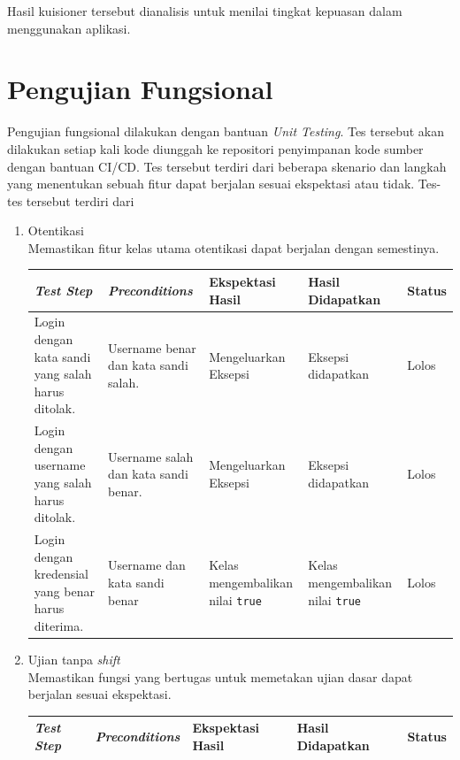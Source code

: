     Hasil kuisioner tersebut dianalisis untuk menilai tingkat kepuasan dalam menggunakan aplikasi.

\section{Pengujian Fungsional}
Pengujian fungsional dilakukan dengan bantuan \textit{Unit Testing}. Tes tersebut akan dilakukan
setiap kali kode diunggah ke repositori penyimpanan kode sumber dengan bantuan CI/CD. Tes tersebut
terdiri dari beberapa skenario dan langkah yang menentukan sebuah fitur dapat berjalan sesuai ekspektasi
atau tidak. Tes-tes tersebut terdiri dari
\begin{enumerate}
    \item Otentikasi\\
        Memastikan fitur kelas utama otentikasi dapat berjalan dengan semestinya.\\
        \begin{longtable}{|p{}|p{}|p{}|p{}|p{}|}
            \hline
            \textit{Test Step} & \textit{Preconditions} & Ekspektasi Hasil & Hasil Didapatkan & Status  \\
            \hline
            \endhead
            Login dengan kata sandi yang salah harus ditolak. & Username benar dan kata sandi salah. & Mengeluarkan Eksepsi & Eksepsi didapatkan & Lolos \\
            \hline
            Login dengan username yang salah harus ditolak. & Username salah dan kata sandi benar. & Mengeluarkan Eksepsi & Eksepsi didapatkan & Lolos \\
            \hline
            Login dengan kredensial yang benar harus diterima. & Username dan kata sandi benar & Kelas mengembalikan nilai \texttt{true} & Kelas mengembalikan nilai \texttt{true} & Lolos \\
            \hline
        \end{longtable}
        
    \item Ujian tanpa \textit{shift}\\
        Memastikan fungsi yang bertugas untuk memetakan ujian dasar dapat berjalan sesuai ekspektasi.\\
         \begin{longtable}{|p{}|p{}|p{}|p{}|p{}|}
            \hline
            \textit{Test Step} & \textit{Preconditions} & Ekspektasi Hasil & Hasil Didapatkan & Status  \\
            \hline
            \endhead
            

\end{longtable}
\end{enumerate}
